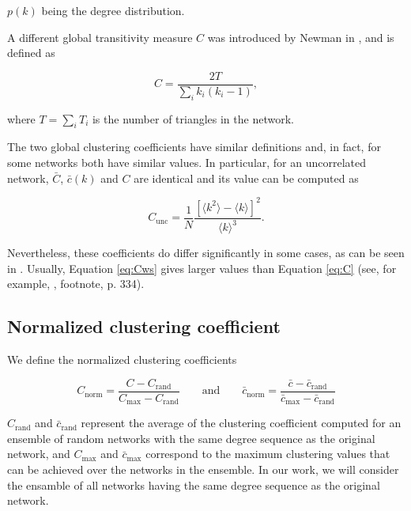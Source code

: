 \documentclass{article}
\begin{document}
$p(k)$ being the degree distribution.

A different global transitivity measure $C$ was introduced by Newman in \cite{Newman2003}, and is defined as 

\begin{equation} \label{eq:C}
    C = \dfrac{2T}{\sum_i k_i (k_i-1)},
\end{equation}

where $T = \sum_i T_i$ is the number of triangles in the network.

The two global clustering coefficients have similar definitions and, in fact, for some networks both have similar values. In particular, for an uncorrelated network, $\bar{C}$, $\bar{c}(k)$ and $C$ are identical and its value can be computed as \cite{NewmanBook} 

\begin{equation} \label{eq:Cunc}
C_{\mathrm{unc}} = \dfrac{1}{N} \dfrac{\left[ \langle k^2 \rangle - \langle k \rangle  \right]^2}{\langle k \rangle^3}.
\end{equation}

Nevertheless, these coefficients do differ significantly in some cases, as can be seen in \cite{Bollobs2004, Estrada2011}. Usually, Equation \ref{eq:Cws} gives larger values than Equation \ref{eq:C} (see, for example, \cite{NewmanBook}, footnote, p. 334).

\subsection{Normalized clustering coefficient}

We define the normalized clustering coefficients

\begin{equation} \label{eq:Cnorm}
C_{\mathrm{norm}} = \dfrac{C - C_{\mathrm{rand}}}{C_{\mathrm{max}} - C_{\mathrm{rand}}}\qquad \text{and} \qquad
\bar{c}_{\mathrm{norm}} = \dfrac{\bar{c} - \bar{c}_{\mathrm{rand}}}{\bar{c}_{\mathrm{max}} - \bar{c}_{\mathrm{rand}}}
\end{equation}

$C_{\mathrm{rand}}$ and $\bar{c}_{\mathrm{rand}}$ represent the average of the clustering coefficient computed for an ensemble of random networks with the same degree sequence as the original network, and $C_{\mathrm{max}}$ and $\bar{c}_{\mathrm{max}}$ correspond to the maximum clustering values that can be achieved over the networks in the ensemble. In our work, we will consider the ensamble of all networks having the same degree sequence as the original network.
\end{document}
